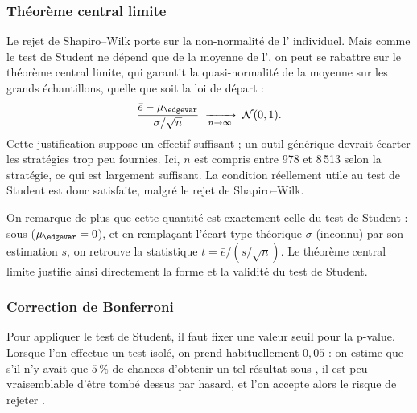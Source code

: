 \subsubsection*{Théorème central limite} %
Le rejet de Shapiro--Wilk porte sur la non-normalité de l'\edgevar{}
individuel. Mais comme le test de Student ne dépend que de la
moyenne de l'\edgevar{}, on peut se rabattre sur le théorème central
limite, qui garantit la quasi-normalité de la moyenne sur les grands
échantillons, quelle que soit la loi de départ :
\[
  \frac{\bar e - \mu_{\edgevar}}{\sigma/\sqrt{n}}
  \;\xrightarrow[n \to \infty]{}\; \mathcal{N}(0,1) .
\]
Cette justification suppose un effectif suffisant ;
un outil générique devrait écarter les stratégies trop peu fournies.
Ici, \(n\) est compris entre 978 et 8\,513 selon la stratégie, ce qui est
largement suffisant.
La condition réellement utile au test de Student est donc satisfaite,
malgré le rejet de Shapiro--Wilk.

On remarque de plus que cette quantité est exactement celle du test de
Student : sous \Hzero{} (\(\mu_{\edgevar} = 0\)), et en remplaçant l'écart-type
théorique \(\sigma\) (inconnu) par son estimation \(s\), on retrouve la
statistique \(t = \bar e / (s/\sqrt{n})\). Le théorème central limite
justifie ainsi directement la forme et la validité du test de Student.

\subsubsection*{Correction de Bonferroni} %
Pour appliquer le test de Student, il faut fixer une valeur seuil pour la
p-value. Lorsque l'on effectue un test isolé, on prend habituellement
\(0{,}05\) : on estime que s'il n'y avait que \(5\,\%\) de chances
d'obtenir un tel résultat sous \Hzero{}, il est peu vraisemblable d'être
tombé dessus par hasard, et l'on accepte alors le risque de rejeter
\Hzero{}.

